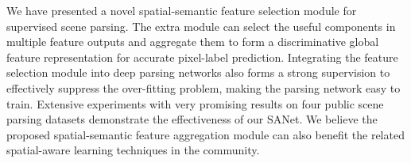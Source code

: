 \documentclass[10pt,twocolumn,twoside]{IEEEtran}
\begin{document}
We have presented a novel spatial-semantic feature selection module for supervised scene parsing. The extra module can select the useful components in multiple feature outputs and aggregate them to form a discriminative global feature representation for accurate pixel-label prediction. Integrating the feature selection module into deep parsing networks also forms a strong supervision to effectively suppress the over-fitting problem, making the parsing network easy to train. Extensive experiments with very promising results on four public scene parsing datasets demonstrate the effectiveness of our SANet. We believe the proposed spatial-semantic feature aggregation module can also benefit the related spatial-aware learning techniques in the community.



\end{document}
